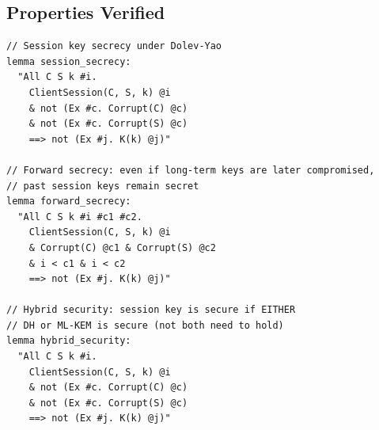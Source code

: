 \subsection{Properties Verified}

\begin{lstlisting}[language=Tamarin,caption={Hybrid handshake security properties}]
// Session key secrecy under Dolev-Yao
lemma session_secrecy:
  "All C S k #i.
    ClientSession(C, S, k) @i
    & not (Ex #c. Corrupt(C) @c)
    & not (Ex #c. Corrupt(S) @c)
    ==> not (Ex #j. K(k) @j)"

// Forward secrecy: even if long-term keys are later compromised,
// past session keys remain secret
lemma forward_secrecy:
  "All C S k #i #c1 #c2.
    ClientSession(C, S, k) @i
    & Corrupt(C) @c1 & Corrupt(S) @c2
    & i < c1 & i < c2
    ==> not (Ex #j. K(k) @j)"

// Hybrid security: session key is secure if EITHER
// DH or ML-KEM is secure (not both need to hold)
lemma hybrid_security:
  "All C S k #i.
    ClientSession(C, S, k) @i
    & not (Ex #c. Corrupt(C) @c)
    & not (Ex #c. Corrupt(S) @c)
    ==> not (Ex #j. K(k) @j)"
\end{lstlisting}

